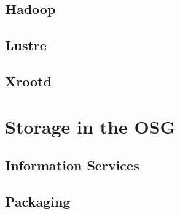 \documentclass{beamer}
\begin{document}
\subsection{Hadoop}
\subsection{Lustre}
\subsection{Xrootd}

\section{Storage in the OSG}
\subsection{Information Services}
\subsection{Packaging}
\end{document}
